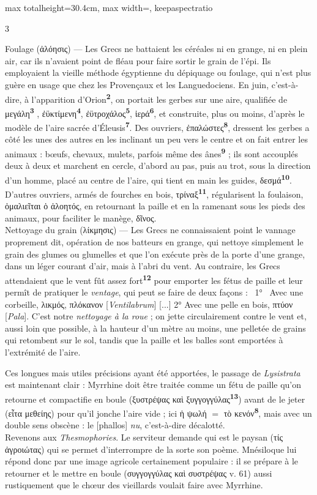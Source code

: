 \documentclass[11pt,twoside]{book}
\newcommand{\italique}[1]{\textit{#1}}
\newcommand{\citComm}[1]{\begin{quoting}[vskip=0.4pt,leftmargin=0.7em,rightmargin=0.2em]#1\end{quoting}}
\newcommand{\latin}[1]{\textit{#1}}
\newcommand{\marqueur}[1]{\textsuperscript{\color{rubricRed}\textbf{#1}}}
\begin{document}
\begin{adjustbox}{max totalheight=30.4cm, max width=\textwidth, keepaspectratio}
\begin{minipage}{\textwidth}
{\begin{multicols}{3}
\citComm{Foulage (ἀλόησις) --- Les Grecs ne battaient les céréales ni en grange, ni en plein air, car ils n'avaient point de fléau pour faire sortir le grain de l'épi. Ils employaient la vieille méthode égyptienne du dépiquage ou foulage, qui n'est plus guère en usage que chez les Provençaux et les Languedociens. En juin, c’est-à-dire, à l'apparition d’Orion\marqueur{2}, on portait les gerbes sur une aire, qualifiée de μεγάλη\marqueur{3} , ἐϋκτίμενη\marqueur{4}, ἐϋτροχάλος\marqueur{5}, ἱερά\marqueur{6}, et construite, plus ou moins, d'après le modèle de l'aire sacrée d'Éleusis\marqueur{7}. Des ouvriers, ἐπαλώστες\marqueur{8}, dressent les gerbes a côté les unes des autres en les inclinant un peu vers le centre et on fait entrer les animaux : bœufs, chevaux, mulets, parfois même des ânes\marqueur{9} ; ils sont accouplés deux à deux et marchent en cercle, d’abord au pas, puis au trot, sous la direction d'un homme, placé au centre de l'aire, qui tient en main les guides, δεσμά\marqueur{10}. D'autres ouvriers, armés de fourches en bois, τρίναξ\marqueur{11}, régularisent la foulaison, ὁμαλιεῖται ὁ ἁλοητός, en retournant la paille et en la ramenant sous les pieds des animaux, pour faciliter le manège, δῖνος.\\
Nettoyage du grain (λίκμησις)  — Les Grecs ne connaissaient point le vannage proprement dit, opération de nos batteurs en grange, qui nettoye simplement le grain des glumes ou glumelles et que l'on exécute près de la porte d’une grange, dans un léger courant d'air, mais à l'abri du vent. Au contraire, les Grecs attendaient que le vent fût assez fort\marqueur{12} pour emporter les fétus de paille et leur permît de pratiquer le \italique{ventage}, qui peut se faire de deux façons :  1°  Avec une corbeille, λικμός, πλόκανον [\latin{Ventilabrum}] [...]    2°   Avec une pelle en bois, πτύον [\latin{Pala}]. C'est notre \italique{nettoyage à la roue} ; on jette circulairement contre le vent et, aussi loin que possible, à la hauteur d’un mètre au moins, une pelletée de grains qui retombent sur le sol, tandis que la paille et les balles sont emportées à l'extrémité de l'aire.}
\par\vspace{1.5pt}
\noindent Ces longues mais utiles précisions ayant été apportées, le passage de \italique{Lysistrata} est maintenant clair : Myrrhine doit être traitée comme un fétu de paille qu'on retourne et compactifie en boule (ξυστρέψας καὶ ξυγγογγύλας\marqueur{13}) avant de le jeter (εἶτα μεθείης) pour qu'il jonche l'aire vide ; ici ἡ ψωλή $=$ τὸ κενόν\marqueur{8}, mais avec un double sens obscène : le [phallos] \italique{nu}, c'est-à-dire décalotté.\\ Revenons aux \italique{Thesmophories}. Le serviteur demande qui est le paysan (τίς ἀγροιώτας) qui se permet d'interrompre de la sorte son poème. Mnésiloque lui répond donc par une image agricole certainement populaire : il se prépare à le retourner et le mettre en boule (συγγογγύλας καὶ συστρέψας v. 61) aussi rustiquement que le chœur des vieillards voulait faire avec Myrrhine.

\end{multicols}}
\end{minipage}
\end{adjustbox}
\end{document}
